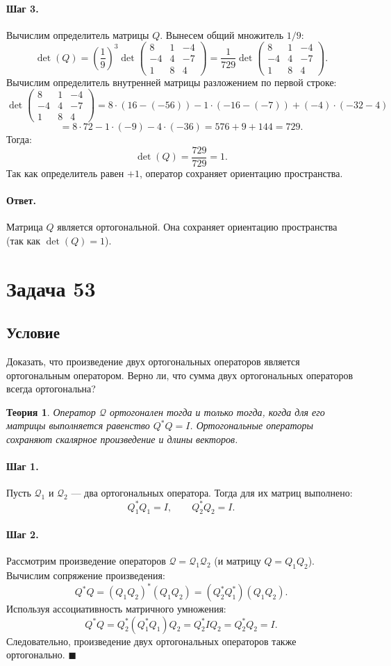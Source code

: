 \documentclass[12pt,a4paper]{article}
\theoremstyle{solution}
\newtheorem*{theory}{Теория}
\newcommand{\task}[1]{\newpage\section*{Задача #1}}
\newcommand{\answer}{\paragraph{Ответ.}}
\newcommand{\step}[1]{\paragraph{Шаг #1.}}
\begin{document}
\step{3} Вычислим определитель матрицы $Q$. Вынесем общий множитель $1/9$:
\[
\det(Q) = \left(\frac{1}{9}\right)^3 \det \begin{pmatrix} 8 & 1 & -4 \\ -4 & 4 & -7 \\ 1 & 8 & 4 \end{pmatrix} = \frac{1}{729} \det \begin{pmatrix} 8 & 1 & -4 \\ -4 & 4 & -7 \\ 1 & 8 & 4 \end{pmatrix}.
\]
Вычислим определитель внутренней матрицы разложением по первой строке:
\[
\det \begin{pmatrix} 8 & 1 & -4 \\ -4 & 4 & -7 \\ 1 & 8 & 4 \end{pmatrix} = 8 \cdot (16 - (-56)) - 1 \cdot (-16 - (-7)) + (-4) \cdot (-32 - 4)
\]
\[
= 8 \cdot 72 - 1 \cdot (-9) - 4 \cdot (-36) = 576 + 9 + 144 = 729.
\]
Тогда:
\[
\det(Q) = \frac{729}{729} = 1.
\]
Так как определитель равен $+1$, оператор сохраняет ориентацию пространства.

\answer
Матрица $Q$ является ортогональной. Она сохраняет ориентацию пространства (так как $\det(Q) = 1$).

\task{53}
\subsection*{Условие}
Доказать, что произведение двух ортогональных операторов является ортогональным оператором. Верно ли, что сумма двух ортогональных операторов всегда ортогональна?

\begin{theory}
Оператор $\mathcal{Q}$ ортогонален тогда и только тогда, когда для его матрицы выполняется равенство $Q^* Q = I$. Ортогональные операторы сохраняют скалярное произведение и длины векторов.
\end{theory}

\step{1} Пусть $\mathcal{Q}_1$ и $\mathcal{Q}_2$ — два ортогональных оператора. Тогда для их матриц выполнено:
\[
Q_1^* Q_1 = I, \qquad Q_2^* Q_2 = I.
\]

\step{2} Рассмотрим произведение операторов $\mathcal{Q} = \mathcal{Q}_1 \mathcal{Q}_2$ (и матрицу $Q = Q_1 Q_2$). Вычислим сопряжение произведения:
\[
Q^* Q = (Q_1 Q_2)^* (Q_1 Q_2) = (Q_2^* Q_1^*) (Q_1 Q_2).
\]
Используя ассоциативность матричного умножения:
\[
Q^* Q = Q_2^* (Q_1^* Q_1) Q_2 = Q_2^* I Q_2 = Q_2^* Q_2 = I.
\]
Следовательно, произведение двух ортогональных операторов также ортогонально. \quad$\blacksquare$
\end{document}
